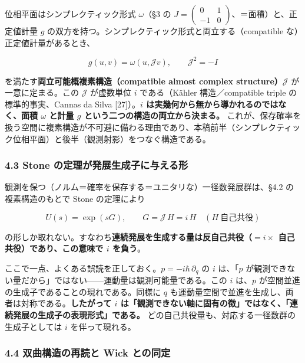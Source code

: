 \documentclass[
]{ltjsarticle}
\begin{document}
位相平面はシンプレクティック形式 \(\omega\)（§3 の
\(J=\begin{pmatrix}0&1\\-1&0\end{pmatrix}\)、＝面積）と、正定値計量
\(g\) の双方を持つ。シンプレクティック形式と両立する（compatible
な）正定値計量があるとき、

\[g(u,v)=\omega(u,\mathcal{J}v),\qquad \mathcal{J}^2=-I\]

を満たす\textbf{両立可能概複素構造（compatible almost complex
structure）\(\mathcal{J}\)} が一意に定まる。この \(\mathcal{J}\)
が虚数単位 \(i\) である（Kähler 構造／compatible triple
の標準的事実、Cannas da Silva {[}27{]}）。\textbf{\(i\)
は実幾何から無から導かれるのではなく、面積 \(\omega\) と計量 \(g\)
という二つの構造の両立から決まる。}
これが、保存確率を扱う空間に複素構造が不可避に備わる理由であり、本稿前半（シンプレクティック位相平面）と後半（観測射影）をつなぐ構造である。

\subsubsection{4.3 Stone
の定理が発展生成子に与える形}\label{stone-ux306eux5b9aux7406ux304cux767aux5c55ux751fux6210ux5b50ux306bux4e0eux3048ux308bux5f62}

観測を保つ（ノルム＝確率を保存する＝ユニタリな）一径数発展群は、§4.2
の複素構造のもとで Stone の定理により

\[U(s)=\exp(sG),\qquad G=\mathcal{J}\,H=i\,H\quad(H\ \text{自己共役})\]

の形しか取れない。すなわち\textbf{連続発展を生成する量は反自己共役（\(=i\times\)
自己共役）であり、この意味で \(i\) を負う}。

ここで一点、よくある誤読を正しておく。\(p=-i\hbar\,\partial_q\) の \(i\)
は、「\(p\)
が観測できない量だから」ではない------運動量は観測可能量である。この
\(i\) は、\(p\) が空間並進の生成子であることの現れである。同様に \(q\)
も運動量空間で並進を生成し、両者は対称である。\textbf{したがって \(i\)
は「観測できない軸に固有の徴」ではなく、「連続発展の生成子の表現形式」である。}
どの自己共役量も、対応する一径数群の生成子としては \(i\)
を伴って現れる。

\subsubsection{4.4 双曲構造の再読と Wick
との同定}\label{ux53ccux66f2ux69cbux9020ux306eux518dux8aadux3068-wick-ux3068ux306eux540cux5b9a}
\end{document}
